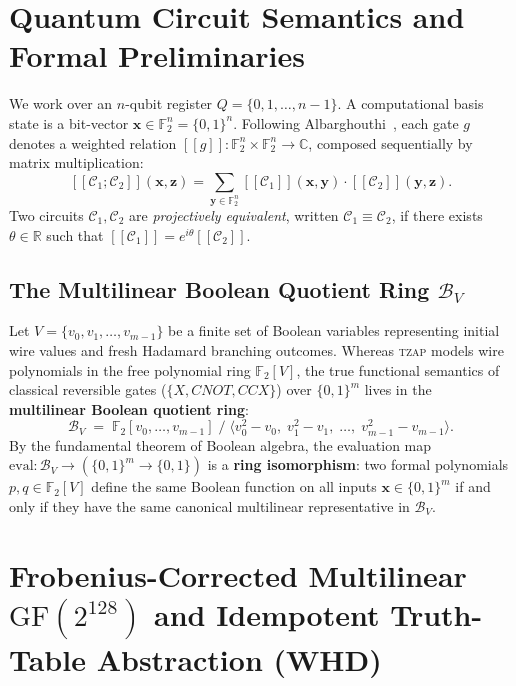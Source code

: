 \documentclass[11pt,a4paper]{article}
\newcommand{\llbracket}{[\![}
\newcommand{\rrbracket}{]\!]}
\theoremstyle{definition}
\begin{document}
\section{Quantum Circuit Semantics and Formal Preliminaries}

We work over an $n$-qubit register $Q = \{0, 1, \dots, n-1\}$. A computational basis state is a bit-vector $\mathbf{x} \in \mathbb{F}_2^n = \{0,1\}^n$. Following Albarghouthi~\cite{albarghouthi2026rand}, each gate $g$ denotes a weighted relation $\llbracket g \rrbracket : \mathbb{F}_2^n \times \mathbb{F}_2^n \to \mathbb{C}$, composed sequentially by matrix multiplication:
\[
  \llbracket \mathcal{C}_1 ; \mathcal{C}_2 \rrbracket(\mathbf{x}, \mathbf{z}) = \sum_{\mathbf{y} \in \mathbb{F}_2^n} \llbracket \mathcal{C}_1 \rrbracket(\mathbf{x}, \mathbf{y}) \cdot \llbracket \mathcal{C}_2 \rrbracket(\mathbf{y}, \mathbf{z}).
\]
Two circuits $\mathcal{C}_1, \mathcal{C}_2$ are \emph{projectively equivalent}, written $\mathcal{C}_1 \equiv \mathcal{C}_2$, if there exists $\theta \in \mathbb{R}$ such that $\llbracket \mathcal{C}_1 \rrbracket = e^{i\theta} \llbracket \mathcal{C}_2 \rrbracket$.

\subsection{The Multilinear Boolean Quotient Ring $\mathcal{B}_V$}

Let $V = \{v_0, v_1, \dots, v_{m-1}\}$ be a finite set of Boolean variables representing initial wire values and fresh Hadamard branching outcomes. Whereas \textsc{tzap} models wire polynomials in the free polynomial ring $\mathbb{F}_2[V]$, the true functional semantics of classical reversible gates ($\{X, \mathit{CNOT}, \mathit{CCX}\}$) over $\{0,1\}^m$ lives in the \textbf{multilinear Boolean quotient ring}:
\[
  \mathcal{B}_V \;=\; \mathbb{F}_2[v_0, \dots, v_{m-1}] \;\big/\; \langle v_0^2 - v_0,\; v_1^2 - v_1,\; \dots,\; v_{m-1}^2 - v_{m-1} \rangle.
\]
By the fundamental theorem of Boolean algebra, the evaluation map $\mathrm{eval} : \mathcal{B}_V \to (\{0,1\}^m \to \{0,1\})$ is a \textbf{ring isomorphism}: two formal polynomials $p, q \in \mathbb{F}_2[V]$ define the same Boolean function on all inputs $\mathbf{x} \in \{0,1\}^m$ if and only if they have the same canonical multilinear representative in $\mathcal{B}_V$.

\section{Frobenius-Corrected Multilinear $\mathrm{GF}(2^{128})$ and Idempotent Truth-Table Abstraction (\textsc{WHD})}
\label{sec:whd}
\end{document}
